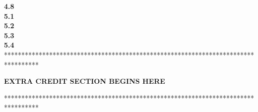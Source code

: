 \documentclass[12pt]{article}
\newcommand\tab[1][1cm]{\hspace*{#1}}
\begin{document}
\pagebreak
\textbf{4.8} \\




\pagebreak
\textbf{5.1} \\



\pagebreak
\textbf{5.2} \\



\pagebreak
\textbf{5.3} \\



\pagebreak
\textbf{5.4} \\




\pagebreak
**********************************************************************************

\tab\tab\tab \textbf{EXTRA CREDIT SECTION BEGINS HERE}

**********************************************************************************
\end{document}
